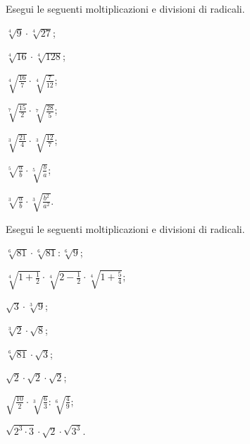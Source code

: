 \begin{esercizio}[\Ast]
 \label{ese:2.37}
Esegui le seguenti moltiplicazioni e divisioni di radicali.
 \begin{multicols}{3}
 \begin{enumeratea}
 \item $\sqrt[4]{9}\cdot\sqrt[4]{27}$;
 \item $\sqrt[4]{16}\cdot\sqrt[4]{128}$;
 \item $\sqrt[4]{\frac{16}{7}}\cdot\sqrt[4]{\frac{7}{12}}$;
 \item $\sqrt[7]{\frac{15}{2}}\cdot\sqrt[7]{\frac{28}{5}}$;
 \item $\sqrt[3]{\frac{21}{4}}\cdot\sqrt[3]{\frac{12}{7}}$;
 \item $\sqrt[5]{\frac{a}{b}}\cdot\sqrt[5]{\frac{b}{a}}$;
 \item $\sqrt[3]{\frac{a}{b}}\cdot\sqrt[3]{\frac{b^2}{a^2}}$.
 \end{enumeratea}
 \end{multicols}
\end{esercizio}

\begin{esercizio}[\Ast]
 \label{ese:2.38}
Esegui le seguenti moltiplicazioni e divisioni di radicali.
 \begin{multicols}{2}
 \begin{enumeratea}
 \item $\sqrt[6]{81}\cdot \sqrt[6]{81}:\sqrt[6]9$;
 \item $\sqrt[4]{1+\frac 1 2}\cdot \sqrt[4]{2-\frac 1 2}\cdot \sqrt[4]{1+\frac 5 4}$;
 \item $\sqrt 3\cdot \sqrt[3]9$;
 \item $\sqrt[3]2\cdot \sqrt 8$;
 \item $\sqrt[6]{81}\cdot \sqrt 3$;
 \item $\sqrt 2\cdot \sqrt 2\cdot\sqrt 2$;
 \item $\sqrt{\frac{10} 2}\cdot \sqrt[3]{\frac 6 3}:\sqrt[6]{\frac 4 9}$;
 \item $\sqrt{2^3\cdot 3}\cdot \sqrt 2\cdot \sqrt{3^3}$.
 \end{enumeratea}
 \end{multicols}
\end{esercizio}

